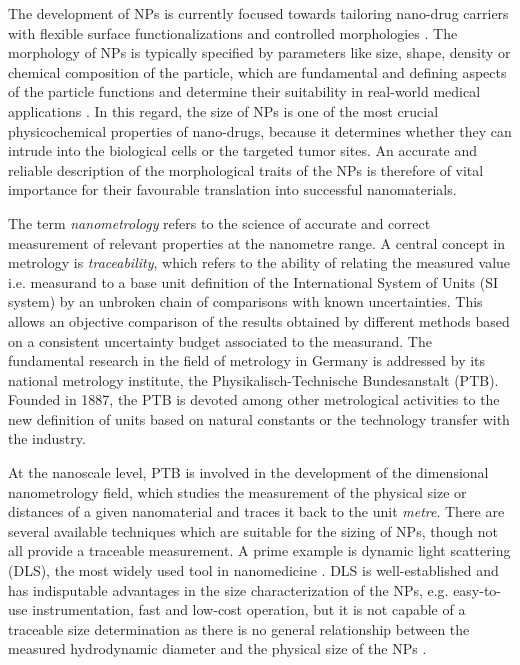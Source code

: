 The development of NPs is currently focused towards tailoring nano-drug carriers with flexible surface functionalizations and controlled morphologies \citep{euliss_imparting_2006,petros_strategies_2010,nicolas_design_2013}. The morphology of NPs is typically specified by parameters like size, shape, density or chemical composition of the particle, which are fundamental and defining aspects of the particle functions and determine their suitability in real-world medical applications \citep{vittaz_effect_1996,canelas_top-down_2009}. In this regard, the size of NPs is one of the most crucial physicochemical properties of nano-drugs, because it determines whether they can intrude into the biological cells or the targeted tumor sites. An accurate and reliable description of the morphological traits of the NPs is therefore of vital importance for their favourable translation into successful nanomaterials.

The term \emph{nanometrology} refers to the science of accurate and correct measurement of relevant properties at the nanometre range. A central concept in metrology is \emph{traceability}, which refers to the ability of relating the measured value i.e. measurand to a base unit definition of the International System of Units (SI system) by an unbroken chain of comparisons with known uncertainties. This allows an objective comparison of the results obtained by different methods based on a consistent uncertainty budget associated to the measurand. The fundamental research in the field of metrology in Germany is addressed by its national metrology institute, the Physikalisch-Technische Bundesanstalt (PTB). Founded in 1887, the PTB is devoted among other metrological activities to the new definition of units based on natural constants or the technology transfer with the industry.

At the nanoscale level, PTB is involved in the development of the dimensional nanometrology field, which studies the measurement of the physical size or distances of a given nanomaterial and traces it back to the unit \emph{metre}. There are several available techniques which are suitable for the sizing of NPs, though not all provide a traceable measurement. A prime example is dynamic light scattering (DLS), the most widely used tool in nanomedicine \citep{murphy_static_1997, hallett_vesicle_1991, egelhaaf_determination_1996, takahashi_precise_2008, jans_dynamic_2009, hoo_comparison_2008}. DLS is well-established and has indisputable advantages in the size characterization of the NPs, e.g. easy-to-use instrumentation, fast and low-cost operation, but it is not capable of a traceable size determination as there is no general relationship between the measured hydrodynamic diameter and the physical size of the NPs \citep{meli_traceable_2012}.

